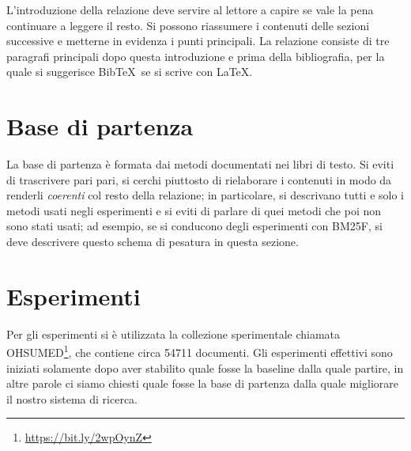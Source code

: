 \documentclass[runningheads]{llncs}
\begin{document}
L'introduzione della relazione deve servire al lettore a capire se
vale la pena continuare a leggere il resto.  Si possono riassumere i
contenuti delle sezioni successive e metterne in evidenza i punti
principali.  La relazione consiste di tre paragrafi principali dopo
questa introduzione e prima della bibliografia, per la quale si
suggerisce Bib\TeX\ se si scrive con \LaTeX.

\section{Base di partenza}
\label{sec:base-di-partenza}

La base di partenza \`e formata dai metodi documentati nei libri di
testo.  Si eviti di trascrivere pari pari, si cerchi piuttosto di
rielaborare i contenuti in modo da renderli \emph{coerenti} col resto
della relazione; in particolare, si descrivano tutti e solo i metodi
usati negli esperimenti e si eviti di parlare di quei metodi che poi
non sono stati usati; ad esempio, se si conducono degli esperimenti
con BM25F, si deve descrivere questo schema di pesatura in questa
sezione.
%
%

\section{Esperimenti}
\label{sec:esperimenti}


Per gli esperimenti si \`e utilizzata la collezione sperimentale
chiamata OHSUMED\footnote{ \url{https://bit.ly/2wpOynZ}}, che contiene circa 54711 documenti.
Gli esperimenti effettivi sono iniziati solamente dopo aver stabilito quale
fosse la baseline dalla quale partire, in altre parole ci siamo chiesti quale
fosse la base di partenza dalla quale  migliorare il nostro sistema
di ricerca.  \par
\end{document}
